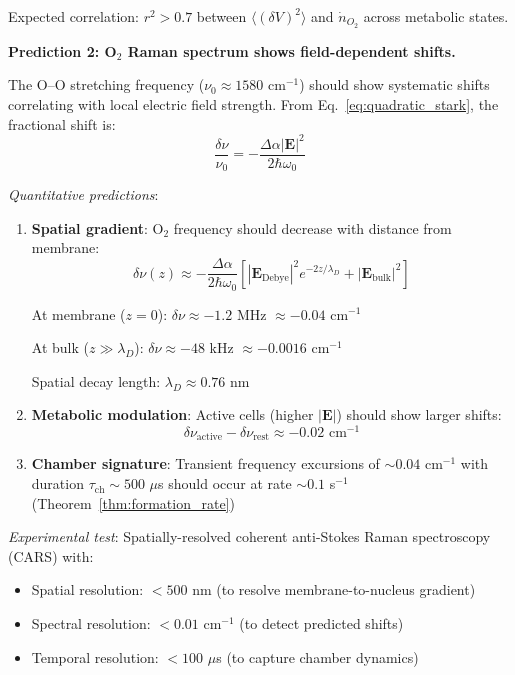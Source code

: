 \documentclass[twocolumn,10pt,aps,prd,superscriptaddress,floatfix,nofootinbib]{revtex4-2}
\theoremstyle{remark}
\begin{document}
Expected correlation: $r^2 > 0.7$ between $\langle(\delta V)^2\rangle$ and $\dot{n}_{O_2}$ across metabolic states.

\textbf{Prediction 2: O$_2$ Raman spectrum shows field-dependent shifts.}

The O--O stretching frequency ($\nu_0 \approx 1580$ cm$^{-1}$) should show systematic shifts correlating with local electric field strength. From Eq.~\eqref{eq:quadratic_stark}, the fractional shift is:
\begin{equation}
\frac{\delta\nu}{\nu_0} = -\frac{\Delta\alpha |\mathbf{E}|^2}{2\hbar\omega_0}
\label{eq:pred_raman_shift}
\end{equation}

\textit{Quantitative predictions}:
\begin{enumerate}
\item \textbf{Spatial gradient}: O$_2$ frequency should decrease with distance from membrane:
\begin{equation}
\delta\nu(z) \approx -\frac{\Delta\alpha}{2\hbar\omega_0}\left[|\mathbf{E}_{\mathrm{Debye}}|^2 e^{-2z/\lambda_D} + |\mathbf{E}_{\mathrm{bulk}}|^2\right]
\end{equation}

At membrane ($z = 0$): $\delta\nu \approx -1.2$ MHz $\approx -0.04$ cm$^{-1}$

At bulk ($z \gg \lambda_D$): $\delta\nu \approx -48$ kHz $\approx -0.0016$ cm$^{-1}$

Spatial decay length: $\lambda_D \approx 0.76$ nm

\item \textbf{Metabolic modulation}: Active cells (higher $|\mathbf{E}|$) should show larger shifts:
\begin{equation}
\delta\nu_{\mathrm{active}} - \delta\nu_{\mathrm{rest}} \approx -0.02 \text{ cm}^{-1}
\end{equation}

\item \textbf{Chamber signature}: Transient frequency excursions of $\sim 0.04$ cm$^{-1}$ with duration $\tau_{\mathrm{ch}} \sim 500$ $\mu$s should occur at rate $\sim 0.1$ s$^{-1}$ (Theorem~\ref{thm:formation_rate})
\end{enumerate}

\textit{Experimental test}: Spatially-resolved coherent anti-Stokes Raman spectroscopy (CARS) with:
\begin{itemize}
\item Spatial resolution: $<500$ nm (to resolve membrane-to-nucleus gradient)
\item Spectral resolution: $<0.01$ cm$^{-1}$ (to detect predicted shifts)
\item Temporal resolution: $<100$ $\mu$s (to capture chamber dynamics)
\end{itemize}
\end{document}
